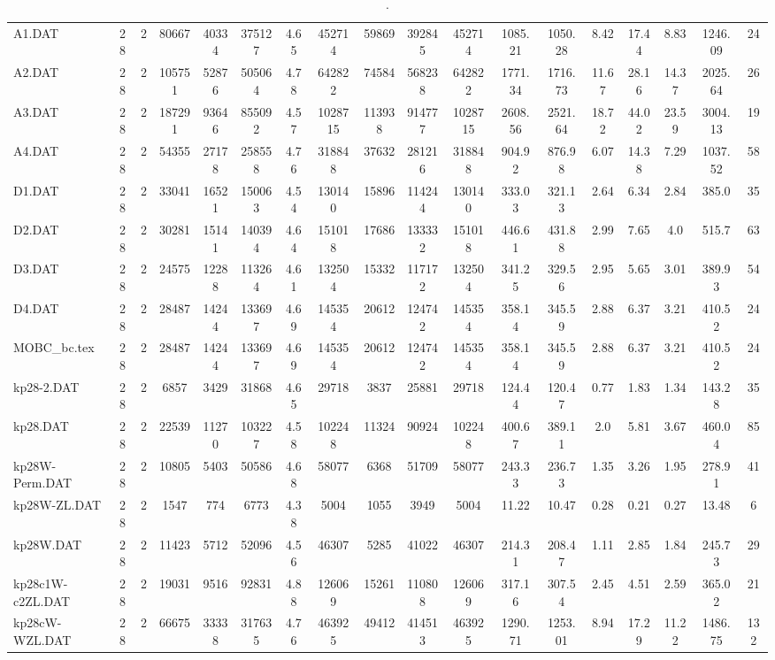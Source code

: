 \begin{sidewaystable}[h]
{\begin{tabular}{lccccccccccccccccc}
A1.DAT & 28 & 2 & 80667 & 40334 & 375127 & 4.65 & 452714 & 59869 & 392845 & 452714 & 1085.21 & 1050.28 & 8.42 & 17.44 & 8.83 & 1246.09 & 24\\
A2.DAT & 28 & 2 & 105751 & 52876 & 505064 & 4.78 & 642822 & 74584 & 568238 & 642822 & 1771.34 & 1716.73 & 11.67 & 28.16 & 14.37 & 2025.64 & 26\\
A3.DAT & 28 & 2 & 187291 & 93646 & 855092 & 4.57 & 1028715 & 113938 & 914777 & 1028715 & 2608.56 & 2521.64 & 18.72 & 44.02 & 23.59 & 3004.13 & 19\\
A4.DAT & 28 & 2 & 54355 & 27178 & 258558 & 4.76 & 318848 & 37632 & 281216 & 318848 & 904.92 & 876.98 & 6.07 & 14.38 & 7.29 & 1037.52 & 58\\
D1.DAT & 28 & 2 & 33041 & 16521 & 150063 & 4.54 & 130140 & 15896 & 114244 & 130140 & 333.03 & 321.13 & 2.64 & 6.34 & 2.84 & 385.0 & 35\\
D2.DAT & 28 & 2 & 30281 & 15141 & 140394 & 4.64 & 151018 & 17686 & 133332 & 151018 & 446.61 & 431.88 & 2.99 & 7.65 & 4.0 & 515.7 & 63\\
D3.DAT & 28 & 2 & 24575 & 12288 & 113264 & 4.61 & 132504 & 15332 & 117172 & 132504 & 341.25 & 329.56 & 2.95 & 5.65 & 3.01 & 389.93 & 54\\
D4.DAT & 28 & 2 & 28487 & 14244 & 133697 & 4.69 & 145354 & 20612 & 124742 & 145354 & 358.14 & 345.59 & 2.88 & 6.37 & 3.21 & 410.52 & 24\\
MOBC\_bc.tex & 28 & 2 & 28487 & 14244 & 133697 & 4.69 & 145354 & 20612 & 124742 & 145354 & 358.14 & 345.59 & 2.88 & 6.37 & 3.21 & 410.52 & 24\\
kp28-2.DAT & 28 & 2 & 6857 & 3429 & 31868 & 4.65 & 29718 & 3837 & 25881 & 29718 & 124.44 & 120.47 & 0.77 & 1.83 & 1.34 & 143.28 & 35\\
kp28.DAT & 28 & 2 & 22539 & 11270 & 103227 & 4.58 & 102248 & 11324 & 90924 & 102248 & 400.67 & 389.11 & 2.0 & 5.81 & 3.67 & 460.04 & 85\\
kp28W-Perm.DAT & 28 & 2 & 10805 & 5403 & 50586 & 4.68 & 58077 & 6368 & 51709 & 58077 & 243.33 & 236.73 & 1.35 & 3.26 & 1.95 & 278.91 & 41\\
kp28W-ZL.DAT & 28 & 2 & 1547 & 774 & 6773 & 4.38 & 5004 & 1055 & 3949 & 5004 & 11.22 & 10.47 & 0.28 & 0.21 & 0.27 & 13.48 & 6\\
kp28W.DAT & 28 & 2 & 11423 & 5712 & 52096 & 4.56 & 46307 & 5285 & 41022 & 46307 & 214.31 & 208.47 & 1.11 & 2.85 & 1.84 & 245.73 & 29\\
kp28c1W-c2ZL.DAT & 28 & 2 & 19031 & 9516 & 92831 & 4.88 & 126069 & 15261 & 110808 & 126069 & 317.16 & 307.54 & 2.45 & 4.51 & 2.59 & 365.02 & 21\\
kp28cW-WZL.DAT & 28 & 2 & 66675 & 33338 & 317635 & 4.76 & 463925 & 49412 & 414513 & 463925 & 1290.71 & 1253.01 & 8.94 & 17.29 & 11.22 & 1486.75 & 132\\
\bottomrule
\end{tabular}%
}%
\caption{.}
\label{tab:table_bc}
\end{sidewaystable}


